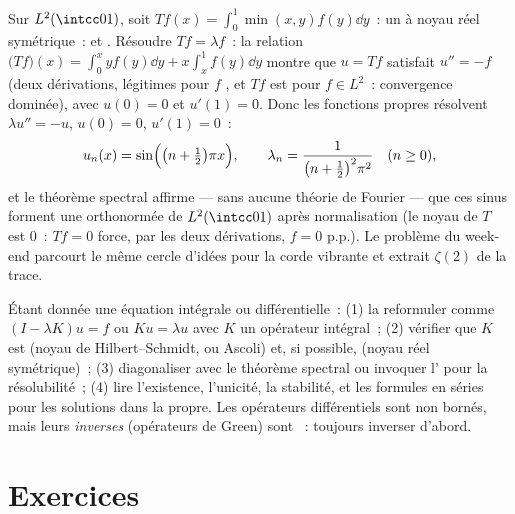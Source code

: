 \begin{example}\label{ex:b3:spectral:minxy}
Sur $L^2(\intcc01)$, soit $Tf(x) = \int_0^1\min(x,
y)f(y)\dd y$~: un  à noyau réel
symétrique~:  et . Résoudre $Tf = \lambda
f$~: la relation $\bigl(Tf\bigr)(x) = \int_0^xyf(y)\dd y +
x\int_x^1f(y)\dd y$ montre que $u = Tf$ satisfait $u'' = -f$
(deux dérivations, légitimes pour $f$ , et $Tf$ est
 pour $f \in L^2$~: convergence dominée), avec $u(0)
= 0$ et $u'(1) = 0$. Donc les fonctions propres résolvent
$\lambda u'' = -u$, $u(0) = 0$, $u'(1) = 0$~:
\[
u_n(x) = \sin\Bigl(\bigl(n + \tfrac12\bigr)\pi x\Bigr),
\qquad
\lambda_n = \frac{1}{\bigl(n + \frac12\bigr)^2\pi^2}
\quad (n \geq 0),
\]
et le théorème spectral affirme --- sans aucune théorie de
Fourier --- que ces sinus forment une  orthonormée de
$L^2(\intcc01)$ après normalisation (le noyau de $T$ est
$0$~: $Tf = 0$ force, par les deux dérivations, $f = 0$
p.p.). Le problème du week-end parcourt le même cercle
d'idées pour la corde vibrante et extrait $\zeta(2)$ de la
trace.
\end{example}

\begin{method}\label{met:b3:spectral:method}
Étant donnée une équation intégrale ou différentielle~: (1)
la reformuler comme $(I - \lambda K)u = f$ ou $Ku = \lambda
u$ avec $K$ un opérateur intégral~; (2) vérifier que $K$ est
 (noyau de Hilbert--Schmidt, ou Ascoli) et, si
possible,  (noyau réel symétrique)~; (3)
diagonaliser avec le théorème spectral ou invoquer
l' pour la résolubilité~; (4) lire
l'existence, l'unicité, la stabilité, et les formules en
séries pour les solutions dans la  propre. Les opérateurs
différentiels sont non bornés, mais leurs \emph{inverses}
(opérateurs de Green) sont ~: toujours inverser
d'abord.
\end{method}

\section{Exercices}

